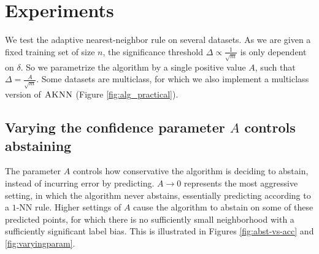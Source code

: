 \documentclass{article}
\newcommand{\samp}{S}
\newcommand{\algname}{\textsc{AKNN}}
\newcommand{\new}[1]{\color{red} #1}
\begin{document}
%


\section{Experiments}

We test the adaptive nearest-neighbor rule on several datasets. As we are given a fixed training set of size $n$, the significance threshold $\Delta \propto \frac{1}{\sqrt{m}}$ is only dependent on $\delta$. So we parametrize the algorithm by a single positive value $A$, such that $\Delta = \frac{A}{\sqrt{m}}$. Some datasets are multiclass, for which we also implement a multiclass version of $\algname$ (Figure \ref{fig:alg_practical}).



\subsection{Varying the confidence parameter $A$ controls abstaining}

The parameter $A$ controls how conservative the algorithm is deciding to abstain, instead of incurring error by predicting. $A \to 0$ represents the most aggressive setting, in which the algorithm never abstains, essentially predicting according to a $1$-NN rule. Higher settings of $A$ cause the algorithm to abstain on some of these predicted points, for which there is no sufficiently small neighborhood with a sufficiently significant label bias. This is illustrated in Figures \ref{fig:abst-vs-acc} and \ref{fig:varyingparam}.
\end{document}
